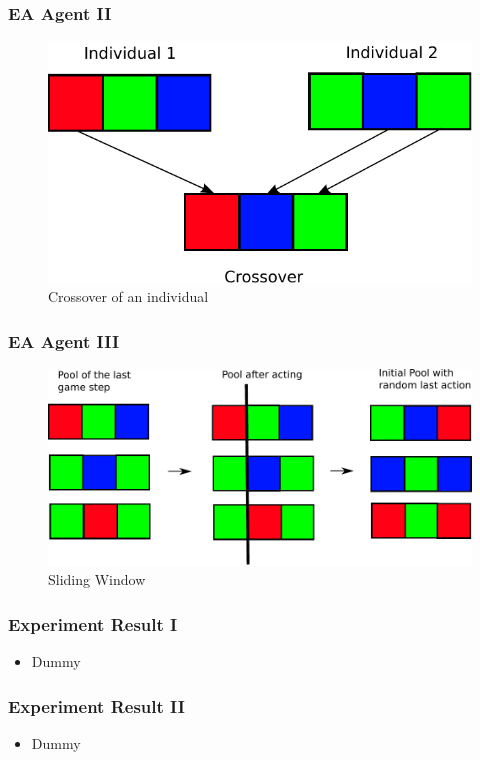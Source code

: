 \documentclass{beamer}
\begin{document}
\begin{frame}
\frametitle{EA Agent II}
\begin{figure}[H]
\centering
\includegraphics[scale=0.6]{../report/images/crossover.pdf}
\caption{Crossover of an individual}
\label{fig:crossover}
\end{figure}
\end{frame}


\begin{frame}
\frametitle{EA Agent III}
\begin{figure}[H]
\centering
\includegraphics[scale=0.6]{../report/images/sliding_window.pdf}
\caption{Sliding Window}
\label{fig:sliding_window}
\end{figure}
\end{frame}


\begin{frame}
\frametitle{Experiment Result I}
\begin{itemize}
 \item Dummy
\end{itemize}
\end{frame}

\begin{frame}
\frametitle{Experiment Result II}
\begin{itemize}
 \item Dummy
\end{itemize}
\end{frame}
\end{document}
